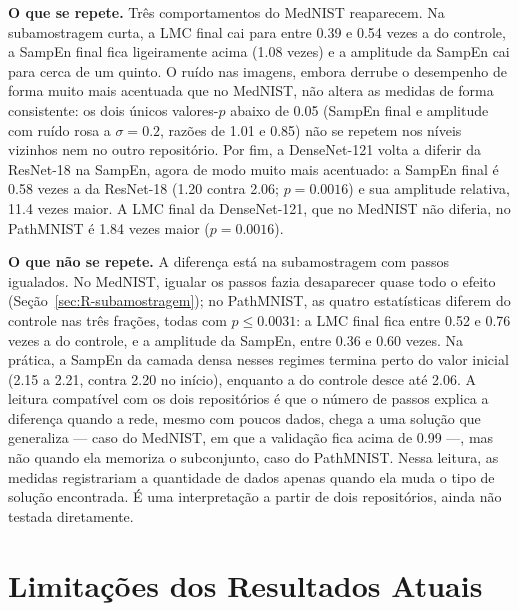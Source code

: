 \textbf{O que se repete.} Três comportamentos do MedNIST reaparecem. Na
subamostragem curta, a LMC final cai para entre \num{0,39} e \num{0,54} vezes
a do controle, a SampEn final fica ligeiramente acima (\num{1,08} vezes) e a
amplitude da SampEn cai para cerca de um quinto. O ruído nas imagens, embora
derrube o desempenho de forma muito mais acentuada que no MedNIST, não altera
as medidas de forma consistente: os dois únicos valores-$p$ abaixo de
\num{0,05} (SampEn final e amplitude com ruído rosa a $\sigma = \num{0,2}$,
razões de \num{1,01} e \num{0,85}) não se repetem nos níveis vizinhos nem no
outro repositório. Por fim, a DenseNet-121 volta a diferir da ResNet-18 na
SampEn, agora de modo muito mais acentuado: a SampEn final é \num{0,58} vezes
a da ResNet-18 (\num{1,20} contra \num{2,06}; $p = \num{0,0016}$) e sua
amplitude relativa, \num{11,4} vezes maior. A LMC final da DenseNet-121, que
no MedNIST não diferia, no PathMNIST é \num{1,84} vezes maior
($p = \num{0,0016}$).

\textbf{O que não se repete.} A diferença está na subamostragem com passos
igualados. No MedNIST, igualar os passos fazia desaparecer quase todo o efeito
(Seção~\ref{sec:R-subamostragem}); no PathMNIST, as quatro estatísticas
diferem do controle nas três frações, todas com $p \le \num{0,0031}$: a LMC
final fica entre \num{0,52} e \num{0,76} vezes a do controle, e a amplitude da
SampEn, entre \num{0,36} e \num{0,60} vezes. Na prática, a SampEn da camada
densa nesses regimes termina perto do valor inicial (\num{2,15} a \num{2,21},
contra \num{2,20} no início), enquanto a do controle desce até \num{2,06}. A
leitura compatível com os dois repositórios é que o número de passos explica a
diferença quando a rede, mesmo com poucos dados, chega a uma solução que
generaliza --- caso do MedNIST, em que a validação fica acima de \num{0,99} ---,
mas não quando ela memoriza o subconjunto, caso do PathMNIST. Nessa leitura,
as medidas registrariam a quantidade de dados apenas quando ela muda o tipo de
solução encontrada. É uma interpretação a partir de dois repositórios, ainda
não testada diretamente.

\section{Limitações dos Resultados Atuais}
\label{sec:R-limitacoes}

